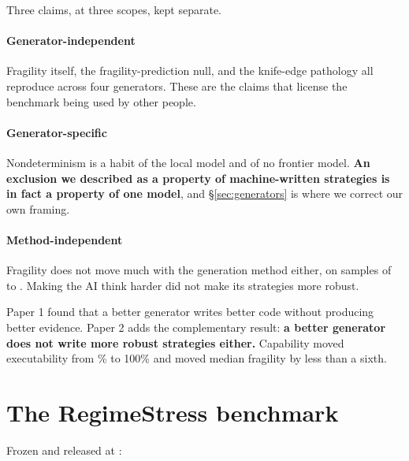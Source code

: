 \documentclass[11pt,a4paper]{article}
\begin{document}
Three claims, at three scopes, kept separate.

\paragraph{Generator-independent \tagindep} Fragility itself, the fragility-prediction null, and
the knife-edge pathology all reproduce across four generators. These are the claims that license
the benchmark being used by other people.

\paragraph{Generator-specific \taglocal} Nondeterminism is a habit of the local model and of no
frontier model. \textbf{An exclusion we described as a property of machine-written strategies is
in fact a property of one model}, and \S\ref{sec:generators} is where we correct our own framing.

\paragraph{Method-independent \tagmethod} Fragility does not move much with the generation method
either, on samples of \pgmGraphFragN{} to \pgmPlainFragN{}. Making the AI think harder did not make
its strategies more robust.

\begin{finding}
Paper 1 found that a better generator writes better code without producing better evidence. Paper 2
adds the complementary result: \textbf{a better generator does not write more robust strategies
either.} Capability moved executability from \pgmLocalTrade\% to 100\% and moved median fragility
by less than a sixth.
\end{finding}

\section{The RegimeStress benchmark}
\label{sec:release}

Frozen and released at \repo:
\end{document}
